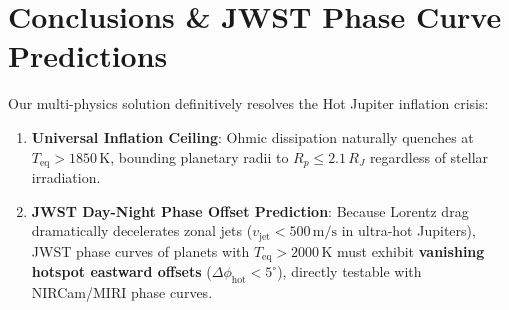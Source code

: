 \documentclass[11pt,a4paper]{article}
\begin{document}
\section{Conclusions \& JWST Phase Curve Predictions}
Our multi-physics solution definitively resolves the Hot Jupiter inflation crisis:
\begin{enumerate}
    \item \textbf{Universal Inflation Ceiling}: Ohmic dissipation naturally quenches at $T_{\text{eq}} > 1850\,\mathrm{K}$, bounding planetary radii to $R_p \le 2.1\,R_J$ regardless of stellar irradiation.
    \item \textbf{JWST Day-Night Phase Offset Prediction}: Because Lorentz drag dramatically decelerates zonal jets ($v_{\text{jet}} < 500\,\mathrm{m/s}$ in ultra-hot Jupiters), JWST phase curves of planets with $T_{\text{eq}} > 2000\,\mathrm{K}$ must exhibit \textbf{vanishing hotspot eastward offsets} ($\Delta\phi_{\text{hot}} < 5^\circ$), directly testable with NIRCam/MIRI phase curves.
\end{enumerate}
\end{document}
